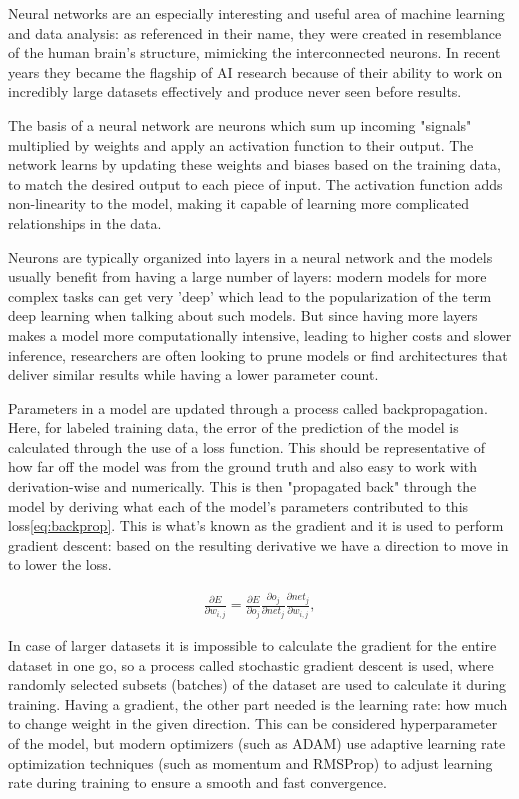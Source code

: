 	Neural networks are an especially interesting and useful area of machine learning and data analysis: as referenced in their name, they were created in resemblance of the human brain's structure, mimicking the interconnected neurons. In recent years they became the flagship of AI research because of their ability to work on incredibly large datasets effectively and produce never seen before results. 
	
	The basis of a neural network are neurons which sum up incoming "signals" multiplied by weights and apply an activation function to their output. The network learns by updating these weights and biases based on the training data, to match the desired output to each piece of input. The activation function adds non-linearity to the model, making it capable of learning more complicated relationships in the data.
	
	Neurons are typically organized into layers in a neural network and the models usually benefit from having a large number of layers: modern models for more complex tasks can get very 'deep' which lead to the popularization of the term deep learning when talking about such models. But since having more layers makes a model more computationally intensive, leading to higher costs and slower inference, researchers are often looking to prune models or find architectures that deliver similar results while having a lower parameter count.
	
	Parameters in a model are updated through a process called backpropagation. Here, for labeled training data, the error of the prediction of the model is calculated through the use of a loss function. This should be representative of how far off the model was from the ground truth and also easy to work with derivation-wise and numerically. This is then "propagated back" through the model by deriving what each of the model's parameters contributed to this loss\ref{eq:backprop}. This is what's known as the gradient and it is used to perform gradient descent: based on the resulting derivative we have a direction to move in to lower the loss.
	
	\begin{align}
		\label{eq:backprop}
		\frac{\partial{E}}{\partial{w_{i,j}}} = \frac{\partial{E}}{\partial{o_j}}\frac{\partial{o_j}}{\partial{net_j}}\frac{\partial{net_j}}{\partial{w_{i,j}}},
	\end{align}
	
	
	In case of larger datasets it is impossible to calculate the gradient for the entire dataset in one go, so a process called stochastic gradient descent is used, where randomly selected subsets (batches) of the dataset are used to calculate it during training. Having a gradient, the other part needed is the learning rate: how much to change weight in the given direction. This can be considered hyperparameter of the model, but modern optimizers (such as ADAM) use adaptive learning rate optimization techniques (such as momentum and RMSProp) to adjust learning rate during training to ensure a smooth and fast convergence.
	
